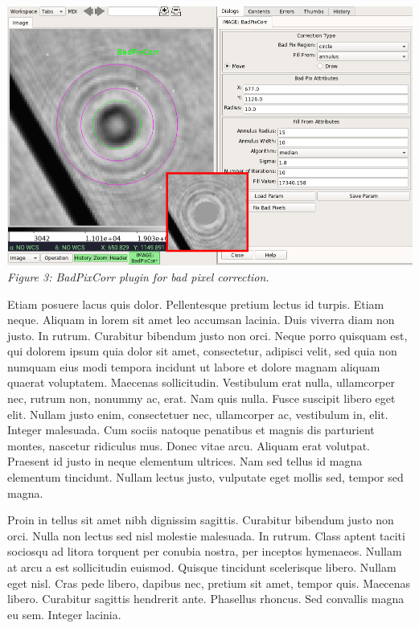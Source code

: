 \documentclass[]{article}
\begin{document}
\begin{multicols}{3}
\para
\begin{center}
\includegraphics[width=8in]{plugin_badpixcorr.png}
\label{fig:plugin_badpixcorr}
\vspace*{0.4em}
{\small\em Figure 3: BadPixCorr plugin for bad pixel correction.}
\end{center}

\para
Etiam posuere lacus quis dolor. Pellentesque pretium lectus id
turpis. Etiam neque. Aliquam in lorem sit amet leo accumsan
lacinia. Duis viverra diam non justo. In rutrum. Curabitur bibendum
justo non orci. Neque porro quisquam est, qui dolorem ipsum quia dolor
sit amet, consectetur, adipisci velit, sed quia non numquam eius modi
tempora incidunt ut labore et dolore magnam aliquam quaerat
voluptatem. Maecenas sollicitudin. Vestibulum erat nulla, ullamcorper
nec, rutrum non, nonummy ac, erat. Nam quis nulla. Fusce suscipit libero
eget elit. Nullam justo enim, consectetuer nec, ullamcorper ac,
vestibulum in, elit. Integer malesuada. Cum sociis natoque penatibus et
magnis dis parturient montes, nascetur ridiculus mus. Donec vitae
arcu. Aliquam erat volutpat. Praesent id justo in neque elementum
ultrices. Nam sed tellus id magna elementum tincidunt. Nullam lectus
justo, vulputate eget mollis sed, tempor sed magna.

\para
Proin in tellus sit amet nibh dignissim sagittis. Curabitur bibendum
justo non orci. Nulla non lectus sed nisl molestie malesuada. In
rutrum. Class aptent taciti sociosqu ad litora torquent per conubia
nostra, per inceptos hymenaeos. Nullam at arcu a est sollicitudin
euismod. Quisque tincidunt scelerisque libero. Nullam eget nisl. Cras
pede libero, dapibus nec, pretium sit amet, tempor quis. Maecenas
libero. Curabitur sagittis hendrerit ante. Phasellus rhoncus. Sed
convallis magna eu sem. Integer lacinia.


\end{multicols}
\end{document}
